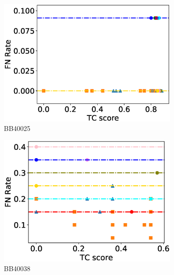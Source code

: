 \begin{figure}[!htbp]
\begin{adjustwidth}{-1cm}{-1cm}
\begin{subfigure}{0.22\textwidth}
			\includegraphics[width=\columnwidth]{Figure/summary/precomputedInit/Balibase/BB40025_fnrate_vs_tc_2}
			\caption{BB40025}
		\end{subfigure}
		\begin{subfigure}{0.22\textwidth}
			\includegraphics[width=\columnwidth]{Figure/summary/precomputedInit/Balibase/BB40038_fnrate_vs_tc_2}
			\caption{BB40038}
		\end{subfigure}	
		\begin{subfigure}{0.22\textwidth}

\end{subfigure}
\end{adjustwidth}
\end{figure}
